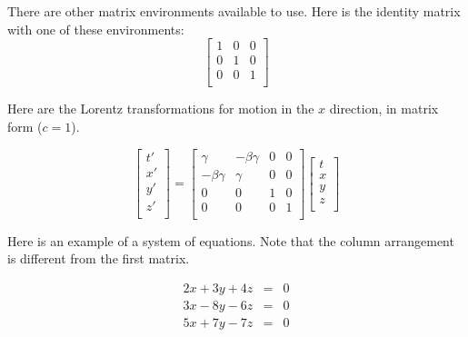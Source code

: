 \documentclass[11pt,letterpaper]{article}
\begin{document}
There are other matrix environments available to use. Here is the identity
matrix with one of these environments:
\begin{displaymath}
    \begin{bmatrix} %
        1 & 0 & 0 \\
        0 & 1 & 0 \\
        0 & 0 & 1 \\
    \end{bmatrix}
\end{displaymath}

Here are the Lorentz transformations \cite{Lorentz} for motion in the $x$
direction, in matrix form ($c = 1$).

\begin{displaymath}
    \begin{bmatrix}
        t \prime \\
        x \prime \\
        y \prime \\
        z \prime\\
    \end{bmatrix}
    =
    \begin{bmatrix} %
        \gamma        & -\beta \gamma & 0 & 0 \\
        -\beta \gamma & \gamma        & 0 & 0 \\
        0             & 0             & 1 & 0 \\
        0             & 0             & 0 & 1 \\
    \end{bmatrix}
    \begin{bmatrix}
        t \\
        x \\
        y \\
        z \\
    \end{bmatrix}
\end{displaymath}

Here is an example of a system of equations. Note that the column arrangement is
different from the first matrix.

\begin{displaymath}
    \begin{array}{lcr}
        2x + 3y + 4z & = & 0 \\
        3x - 8y - 6z & = & 0 \\
        5x + 7y - 7z & = & 0 \\
    \end{array}
\end{displaymath}
\end{document}
